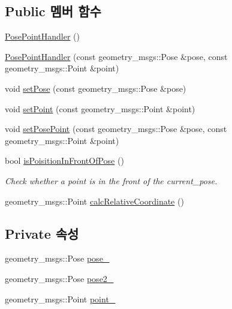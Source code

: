 \subsection*{Public 멤버 함수}
\begin{DoxyCompactItemize}
\item 
\hyperlink{class_pose_point_handler_a752ad3fb30dbe034908e7e6be50b9a42}{Pose\+Point\+Handler} ()
\item 
\hyperlink{class_pose_point_handler_a6c9b665fb0434622641bb1c1e71d40ef}{Pose\+Point\+Handler} (const geometry\+\_\+msgs\+::\+Pose \&pose, const geometry\+\_\+msgs\+::\+Point \&point)
\item 
void \hyperlink{class_pose_point_handler_ae75fcd9ec5c7dcf9194939aa631e47ae}{set\+Pose} (const geometry\+\_\+msgs\+::\+Pose \&pose)
\item 
void \hyperlink{class_pose_point_handler_a948561235698288597b3c65f03f1d1aa}{set\+Point} (const geometry\+\_\+msgs\+::\+Point \&point)
\item 
void \hyperlink{class_pose_point_handler_a6d037671a1c93d9d51a7b0e40eacd3fa}{set\+Pose\+Point} (const geometry\+\_\+msgs\+::\+Pose \&pose, const geometry\+\_\+msgs\+::\+Point \&point)
\item 
bool \hyperlink{class_pose_point_handler_a030d4318ea42d398798b675624ebd07b}{is\+Poisition\+In\+Front\+Of\+Pose} ()
\begin{DoxyCompactList}\small\item\em Check whether a point is in the front of the current\+\_\+pose. \end{DoxyCompactList}\item 
geometry\+\_\+msgs\+::\+Point \hyperlink{class_pose_point_handler_a8ca33b37d5cb22e1310b863fcb94676c}{calc\+Relative\+Coordinate} ()
\end{DoxyCompactItemize}
\subsection*{Private 속성}
\begin{DoxyCompactItemize}
\item 
geometry\+\_\+msgs\+::\+Pose \hyperlink{class_pose_point_handler_ab78a62b6b03dee10487bf53339685a7d}{pose\+\_\+}
\item 
geometry\+\_\+msgs\+::\+Pose \hyperlink{class_pose_point_handler_ad615a2da1c3cd5cc3b5162390dac6136}{pose2\+\_\+}
\item 
geometry\+\_\+msgs\+::\+Point \hyperlink{class_pose_point_handler_aa6dc915c1a9a98a64dd78c51f4b5ae02}{point\+\_\+}
\end{DoxyCompactItemize}


